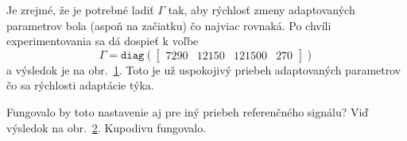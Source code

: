\documentclass[a4paper, 10pt, ]{article}
\begin{document}
\begin{figure}[!b]
	\centering

    \vspace{-3mm}


    \vspace{-2mm}

	\caption{}
	\label{figsc_ar06_kyvadlo_ep2_2}


    \vspace{-2mm}

\end{figure}






Je zrejmé, že je potrebné ladiť $\Gamma$ tak, aby rýchlosť zmeny adaptovaných parametrov bola (aspoň na začiatku) čo najviac rovnaká. Po chvíli experimentovania sa dá dospieť k voľbe
\begin{equation*}
    \Gamma = \texttt{diag}
    \left(
    \begin{bmatrix}
        7290 & 12150 & 121500 & 270
    \end{bmatrix}
    \right)
\end{equation*}
a výsledok je na obr.~\ref{figsc_ar06_kyvadlo_ep2_2}. Toto je už uspokojivý priebeh adaptovaných parametrov čo sa rýchlosti adaptácie týka.










Fungovalo by toto nastavenie aj pre iný priebeh referenčného signálu? Viď výsledok na obr.~\ref{figsc_ar06_kyvadlo_ep2_3}. Kupodivu fungovalo.






\begin{figure}[!t]
	\centering

    \vspace{-3mm}


    \vspace{-2mm}

	\caption{}
	\label{figsc_ar06_kyvadlo_ep2_3}


    \vspace{-2mm}

\end{figure}
\end{document}
